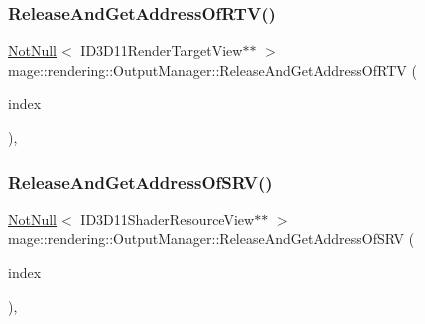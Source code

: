 \subsubsection{\texorpdfstring{Release\+And\+Get\+Address\+Of\+R\+T\+V()}{ReleaseAndGetAddressOfRTV()}}
{\footnotesize\ttfamily \hyperlink{namespacemage_a8769f9d670d6b585ea306cb1062af94b}{Not\+Null}$<$ I\+D3\+D11\+Render\+Target\+View$\ast$$\ast$ $>$ mage\+::rendering\+::\+Output\+Manager\+::\+Release\+And\+Get\+Address\+Of\+R\+TV (\begin{DoxyParamCaption}\item[{\hyperlink{classmage_1_1rendering_1_1_output_manager_af9caebb7e9cacf454d26b827a01e857c}{R\+T\+V\+Index}}]{index }\end{DoxyParamCaption})\hspace{0.3cm}{\ttfamily [private]}, {\ttfamily [noexcept]}}

\hypertarget{classmage_1_1rendering_1_1_output_manager_afd13c25f8ab6cfafc5d694d3b64405f9}{}\label{classmage_1_1rendering_1_1_output_manager_afd13c25f8ab6cfafc5d694d3b64405f9} 
\subsubsection{\texorpdfstring{Release\+And\+Get\+Address\+Of\+S\+R\+V()}{ReleaseAndGetAddressOfSRV()}}
{\footnotesize\ttfamily \hyperlink{namespacemage_a8769f9d670d6b585ea306cb1062af94b}{Not\+Null}$<$ I\+D3\+D11\+Shader\+Resource\+View$\ast$$\ast$ $>$ mage\+::rendering\+::\+Output\+Manager\+::\+Release\+And\+Get\+Address\+Of\+S\+RV (\begin{DoxyParamCaption}\item[{\hyperlink{classmage_1_1rendering_1_1_output_manager_a941f1b35a83ee0ce190494523ec0fe63}{S\+R\+V\+Index}}]{index }\end{DoxyParamCaption})\hspace{0.3cm}{\ttfamily [private]}, {\ttfamily [noexcept]}}

\hypertarget{classmage_1_1rendering_1_1_output_manager_a79ec82aadfe89ea1a9875567d9bbb74a}{}\label{classmage_1_1rendering_1_1_output_manager_a79ec82aadfe89ea1a9875567d9bbb74a} 
